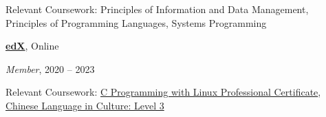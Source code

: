 \documentclass[
]{article}
\begin{document}
Relevant Coursework: Principles of Information and Data Management, Principles of Programming Languages, Systems Programming


\href{https://www.edx.org/}{\textbf{edX}}, Online

\emph{Member}, 2020 -- 2023

Relevant Coursework: 
 \href{https://credentials.edx.org/credentials/1782d3571b2945de9b421230968ace62/}{C Programming with Linux Professional Certificate},
 \href{https://courses.edx.org/certificates/675cc428e361416088f6761ff6003cc1}{Chinese Language in Culture: Level 3}








\end{document}
